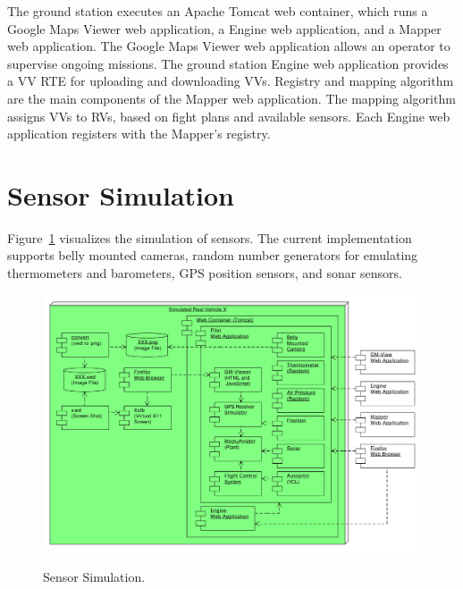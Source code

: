 The ground station executes an Apache Tomcat web container, which runs a Google Maps Viewer
web application, a Engine web application, and a Mapper web application.
%
The Google Maps Viewer web application allows an operator to supervise ongoing missions.
%
The ground station Engine web application provides a \ac{VV RTE} for uploading and downloading \acp{VV}. 
%
Registry and mapping algorithm are the main components of the Mapper web application.
The mapping algorithm assigns \acp{VV} to \acp{RV}, based on fight plans and available sensors.
%
Each Engine web application registers with the Mapper's registry.


\section{Sensor Simulation}
Figure~\ref{fig:SensorSimulation} visualizes the simulation of sensors.
%
The current implementation supports belly mounted cameras, random number generators for emulating thermometers and
barometers, GPS position sensors, and sonar sensors.

 
\begin{figure}[h]
	\begin{center}
		{\includegraphics[width=11.6cm]{SensorSimulation-3.pdf}}
	\end{center}
	\caption{Sensor Simulation.\label{fig:SensorSimulation}}
\end{figure}



